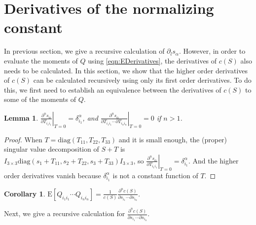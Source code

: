 \documentclass[10pt]{article}
\newtheorem{corollary}{Corollary}
\newtheorem{lemma}{Lemma}
\newcommand{\expect}[1]{\ensuremath{\mathrm{E}\left[ #1 \right]}}
\begin{document}
\section{Derivatives of the normalizing constant}

In previous section, we give a recursive calculation of $\partial_l s_\alpha$.
However, in order to evaluate the moments of $Q$ using \eqref{eqn:EDerivatives}, the derivatives of $c(S)$ also needs to be calculated.
In this section, we show that the higher order derivatives of $c(S)$ can be calculated recursively using only its first order derivatives.
To do this, we first need to establish an equivalence between the derivatives of $c(S)$ to some of the moments of $Q$.
\begin{lemma}
	$\left. \frac{\partial^n s_\alpha}{\partial T_{i_1i_1}} \right|_{T=0} = \delta_{i_1}^\alpha$, and $\left. \frac{\partial^n s_\alpha}{\partial T_{i_1i_1} \cdots \partial T_{i_ni_n}} \right|_{T=0} = 0$ if $n>1$.
\end{lemma}
\begin{proof}
	When $T = \mathrm{diag}(T_{11},T_{22},T_{33})$ and it is small enough, the (proper) singular value decomposition of $S+T$ is $I_{3\times 3} \mathrm{diag}(s_1+T_{11}, s_2+T_{22}, s_3+T_{33}) I_{3\times 3}$, so $\left. \frac{\partial^n s_\alpha}{\partial T_{i_1i_1}} \right|_{T=0} = \delta_{i_1}^\alpha$.
	And the higher order derivatives vanish because $\delta_{i_1}^\alpha$ is not a constant function of $T$.
\end{proof}

\begin{corollary} \label{cor:EQ=DcDs}
	$\expect{Q_{i_1i_1} \cdots Q_{i_ni_n}} = \frac{1}{c(S)} \frac{\partial^n c(S)}{\partial s_{i_1} \cdots \partial s_{i_n}}$.
\end{corollary}

Next, we give a recursive calculation for $\frac{\partial^n c(S)}{\partial s_{i_1} \cdots \partial s_{i_n}}$.
\end{document}
